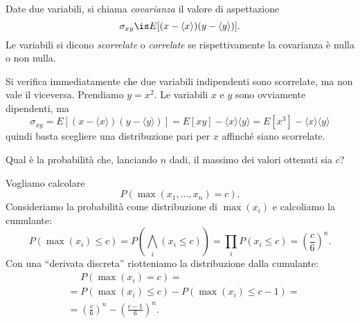 
\begin{defn}[Covarianza]
	Date due variabili, si chiama \emph{covarianza} il valore di aspettazione
	\begin{equation*}
		\sigma_{xy} \is E[(x-\langle x\rangle)(y-\langle y\rangle)].
	\end{equation*}
	Le variabili si dicono \emph{scorrelate} o \emph{correlate} se rispettivamente la covarianza è nulla o non nulla.
\end{defn}

Si verifica immediatamente che due variabili indipendenti sono scorrelate, ma non vale il viceversa.
Prendiamo $y=x^2$. Le variabili $x$ e $y$ sono ovviamente dipendenti, ma
\begin{equation*}
	\sigma_{xy} = E[(x-\langle x\rangle)(y-\langle y\rangle)] = E[xy] - \langle x\rangle\langle y\rangle = E[x^3] - \langle x\rangle\langle y\rangle
\end{equation*}
quindi basta scegliere una distribuzione pari per $x$ affinché siano scorrelate.

\begin{ex}
	Qual è la probabilità che, lanciando $n$ dadi, il massimo dei valori ottenuti sia $c$?
\end{ex}

\begin{solution*}
	Vogliamo calcolare
	\begin{equation*}
		P(\max(x_1,\dots,x_n) = c).
	\end{equation*}
	Consideriamo la probabilità come distribuzione di $\max(x_i)$ e calcoliamo la cumulante:
	\begin{equation*}
		P(\max(x_i) \le c) = P\left(\bigwedge_i(x_i \le c)\right) = \prod_i P(x_i \le c) = \left (\frac c6 \right)^n.
	\end{equation*}
	Con una ``derivata discreta'' riotteniamo la distribuzione dalla cumulante:
	\begin{align*}
		&\phantom{{}={}} P(\max(x_i) = c) = \\
		&= P(\max(x_i) \le c) - P(\max(x_i) \le c-1) = \\
		&= \left (\frac c6 \right)^n - \left (\frac {c-1}6 \right)^n.
	\end{align*}
\end{solution*}

